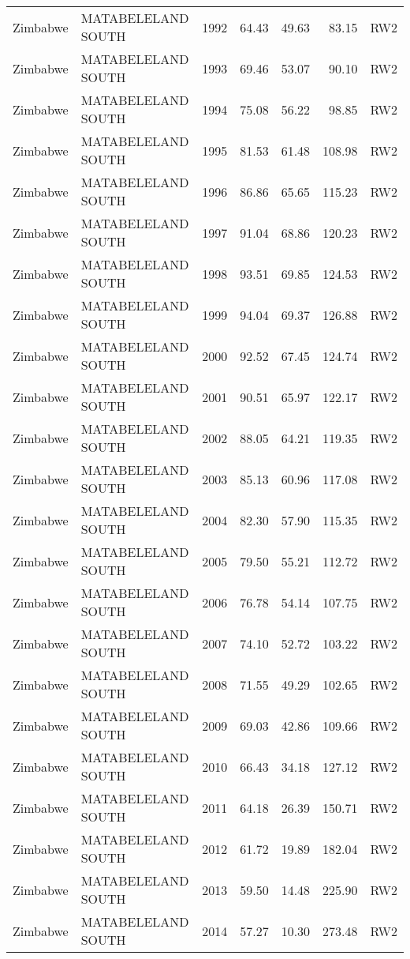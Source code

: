 \begin{longtable}{lllrrrl}
  Zimbabwe & MATABELELAND SOUTH & 1992 & 64.43 & 49.63 & 83.15 & RW2 \\ 
  Zimbabwe & MATABELELAND SOUTH & 1993 & 69.46 & 53.07 & 90.10 & RW2 \\ 
  Zimbabwe & MATABELELAND SOUTH & 1994 & 75.08 & 56.22 & 98.85 & RW2 \\ 
  Zimbabwe & MATABELELAND SOUTH & 1995 & 81.53 & 61.48 & 108.98 & RW2 \\ 
  Zimbabwe & MATABELELAND SOUTH & 1996 & 86.86 & 65.65 & 115.23 & RW2 \\ 
  Zimbabwe & MATABELELAND SOUTH & 1997 & 91.04 & 68.86 & 120.23 & RW2 \\ 
  Zimbabwe & MATABELELAND SOUTH & 1998 & 93.51 & 69.85 & 124.53 & RW2 \\ 
  Zimbabwe & MATABELELAND SOUTH & 1999 & 94.04 & 69.37 & 126.88 & RW2 \\ 
  Zimbabwe & MATABELELAND SOUTH & 2000 & 92.52 & 67.45 & 124.74 & RW2 \\ 
  Zimbabwe & MATABELELAND SOUTH & 2001 & 90.51 & 65.97 & 122.17 & RW2 \\ 
  Zimbabwe & MATABELELAND SOUTH & 2002 & 88.05 & 64.21 & 119.35 & RW2 \\ 
  Zimbabwe & MATABELELAND SOUTH & 2003 & 85.13 & 60.96 & 117.08 & RW2 \\ 
  Zimbabwe & MATABELELAND SOUTH & 2004 & 82.30 & 57.90 & 115.35 & RW2 \\ 
  Zimbabwe & MATABELELAND SOUTH & 2005 & 79.50 & 55.21 & 112.72 & RW2 \\ 
  Zimbabwe & MATABELELAND SOUTH & 2006 & 76.78 & 54.14 & 107.75 & RW2 \\ 
  Zimbabwe & MATABELELAND SOUTH & 2007 & 74.10 & 52.72 & 103.22 & RW2 \\ 
  Zimbabwe & MATABELELAND SOUTH & 2008 & 71.55 & 49.29 & 102.65 & RW2 \\ 
  Zimbabwe & MATABELELAND SOUTH & 2009 & 69.03 & 42.86 & 109.66 & RW2 \\ 
  Zimbabwe & MATABELELAND SOUTH & 2010 & 66.43 & 34.18 & 127.12 & RW2 \\ 
  Zimbabwe & MATABELELAND SOUTH & 2011 & 64.18 & 26.39 & 150.71 & RW2 \\ 
  Zimbabwe & MATABELELAND SOUTH & 2012 & 61.72 & 19.89 & 182.04 & RW2 \\ 
  Zimbabwe & MATABELELAND SOUTH & 2013 & 59.50 & 14.48 & 225.90 & RW2 \\ 
  Zimbabwe & MATABELELAND SOUTH & 2014 & 57.27 & 10.30 & 273.48 & RW2 \\ 

\end{longtable}
